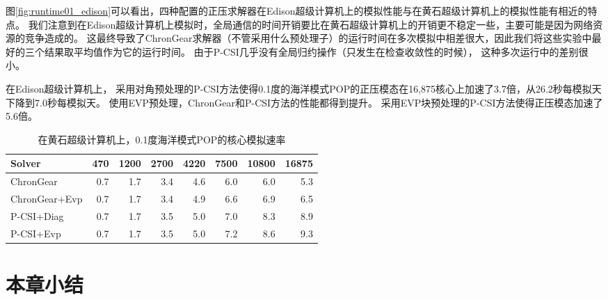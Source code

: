 图\ref{fig:runtime01_edison}可以看出，四种配置的正压求解器在Edison超级计算机上的模拟性能与在黄石超级计算机上的模拟性能有相近的特点。 
我们注意到在Edison超级计算机上模拟时，全局通信的时间开销要比在黄石超级计算机上的开销更不稳定一些，主要可能是因为网络资源的竞争造成的\cite{wang2014}。 
这最终导致了ChronGear求解器（不管采用什么预处理子）的运行时间在多次模拟中相差很大，因此我们将这些实验中最好的三个结果取平均值作为它的运行时间。 
由于P-CSI几乎没有全局归约操作（只发生在检查收敛性的时候）， 这种多次运行中的差别很小。 

 
在Edison超级计算机上， 采用对角预处理的P-CSI方法使得0.1度的海洋模式POP的正压模态在16,875核心上加速了3.7倍，从26.2秒每模拟天下降到7.0秒每模拟天。 
使用EVP预处理，ChronGear和P-CSI方法的性能都得到提升。 
采用EVP块预处理的P-CSI方法使得正压模态加速了5.6倍。 
 
 
\begin{table}
\begin{center}
\caption {在黄石超级计算机上，0.1度海洋模式POP的核心模拟速率\label{tab:improve_01}}
\begin{tabular}{|l||r|r|r|r|r|r|r|}
\hline
Solver & 470  & 1200   & 2700 & 4220 & 7500 & 10800 & 16875\\\hline
\hline
ChronGear     &0.7 &1.7&3.4  &4.6 &6.0 &6.0 &5.3\\\hline
ChronGear+Evp &0.7 &1.7&3.4  &4.9 &6.6 &6.9 &6.5\\\hline
P-CSI+Diag    &0.7 &1.7&3.5  &5.0 &7.0 &8.3 &8.9\\\hline
P-CSI+Evp     &0.7 &1.7&3.5  &5.0 &7.2 &8.6 &9.3\\
\hline
\end{tabular}
\end{center}
\end{table}

\section{本章小结}
\label{sec:precondConclusion}
